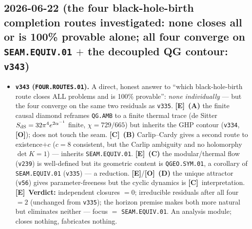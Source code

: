 \documentclass[11pt]{article}
\providecommand{\mE}{\textbf{[E]}}\providecommand{\mC}{\textbf{[C]}}
\providecommand{\mO}{\textbf{[O]}}\providecommand{\mX}{\textbf{[X]}}
\providecommand{\vref}[1]{\texttt{#1}}
\begin{document}
\subsection*{2026-06-22 (the four black-hole-birth completion routes investigated: none closes all or is 100\% provable alone; all four converge on \texttt{SEAM.EQUIV.01} $+$ the decoupled QG contour: \texttt{v343})}
\begin{itemize}
\item \textbf{\texttt{v343} (\texttt{FOUR.ROUTES.01}).} A direct, honest answer to ``which black-hole-birth route
closes ALL problems and is 100\% provable'': \emph{none individually} --- but the four converge on the same two
residuals as \vref{v335}. \mE\ \textbf{(A)} the finite causal diamond reframes \texttt{QG.AMB} to a finite thermal
trace (de Sitter $S_{\mathrm{dS}}=32\pi^4 e^{2\alpha^{-1}}$ finite, $\chi=729/665$) but inherits the GHP contour
(\vref{v334}, \mO); does not touch the seam. \mC\ \textbf{(B)} Carlip--Cardy gives a second route to existence$+c$
($c{=}8$ consistent, but the Carlip ambiguity and no holomorphy $\det K{=}1$) --- inherits \texttt{SEAM.EQUIV.01}.
\mE\ \textbf{(C)} the modular/thermal flow (\vref{v239}) is well-defined but its geometric content is
\texttt{QGEO.SYM.01}, a corollary of \texttt{SEAM.EQUIV.01} (\vref{v335}) --- a reduction. \mE/\mO\ \textbf{(D)} the
unique attractor (\vref{v56}) gives parameter-freeness but the cyclic dynamics is \mC\ interpretation. \mE\
\textbf{Verdict:} independent closures $=0$; irreducible residuals after all four $=2$ (unchanged from \vref{v335});
the horizon premise makes both more natural but eliminates neither --- focus $=$ \texttt{SEAM.EQUIV.01}. An analysis
module; closes nothing, fabricates nothing.
\end{itemize}
\end{document}
